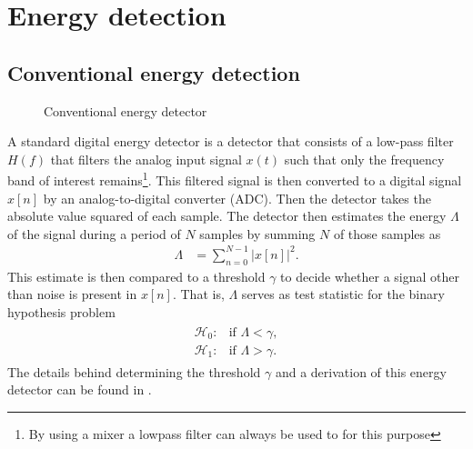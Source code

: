 \documentclass[a4paper, openany, oneside]{memoir}
\begin{document}
\section{Energy detection}

\subsection{Conventional energy detection}\label{sec:conv_ed}
\begin{figure}[H]
\centering
{}
\caption{Conventional energy detector}\label{tkz:conv_ed}
\end{figure}
A standard digital energy detector is a detector that consists of a low-pass filter $H(f)$ that filters the analog input signal $x(t)$ such
that only the frequency band of interest remains\footnote{By using a mixer a lowpass filter can always be used to for this purpose}. This filtered signal is then converted to a digital signal $x[n]$ by an analog-to-digital converter (ADC). Then the detector takes the absolute value squared of each sample. The detector then estimates the energy $\Lambda$ of the signal during a period of $N$ samples by summing $N$ of those samples as
\begin{align}\label{eq:test_ed}
	\Lambda &= \sum_{n=0}^{N-1} |x[n]|^2.
\end{align}
This estimate is then compared to a threshold $\gamma$ to decide whether a signal other than noise is present in $x[n]$. That is, $\Lambda$ serves as test statistic for the binary hypothesis problem
\begin{align*}
	\begin{array}{ll}
		\mathcal{H}_0: & \text{if } \Lambda < \gamma, \\
		\mathcal{H}_1: & \text{if } \Lambda > \gamma.
	\end{array}
\end{align*}
The details behind determining the threshold $\gamma$ and a derivation of this energy detector can be found in .
\end{document}
